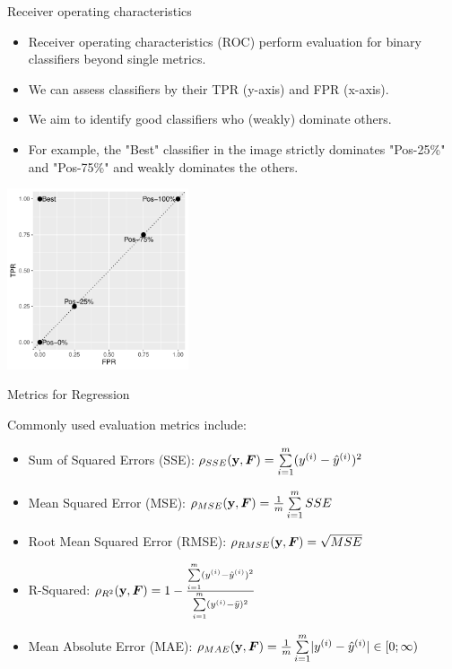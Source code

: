 \documentclass[11pt,compress,t,notes=noshow, xcolor=table]{beamer}
\begin{document}
\begin{vbframe}{Receiver operating characteristics}

\begin{itemize}
\item Receiver operating characteristics (ROC) perform evaluation for binary classifiers beyond single metrics.
\item We can assess classifiers by their TPR (y-axis) and FPR (x-axis).
\item We aim to identify good classifiers who (weakly) dominate others. 
\item For example, the "Best" classifier in the image strictly dominates "Pos-25\%" and "Pos-75\%" and weakly dominates the others.
\end{itemize}
\begin{center}
    {\centering \includegraphics[width=0.4\textwidth]{figure/eval_mclass_roc_sp_2}}
    \end{center}


\end{vbframe}


\begin{vbframe}{Metrics for Regression}

Commonly used evaluation metrics include:
\begin{itemize}
\item Sum of Squared Errors (SSE): $\rho_{SSE}(\mathbf{y}, \boldsymbol{F})=\sum\limits_{i=1}^m (y^{(i)}- \hat{y}^{(i)})^2$
\item Mean Squared Error (MSE): $\rho_{MSE}(\mathbf{y}, \boldsymbol{F})=\frac{1}{m} \sum\limits_{i=1}^m SSE$
\item Root Mean Squared Error (RMSE): $\rho_{RMSE}(\mathbf{y}, \boldsymbol{F})= \sqrt{MSE}$
\item R-Squared: $\rho_{R^2}(\mathbf{y}, \boldsymbol{F}) = 1 - \frac{\sum\limits_{i=1}^m (y^{(i)}- \hat{y}^{(i)})^2}{\sum\limits_{i=1}^m (y^{(i)} - \bar{y})^2}$
\item Mean Absolute Error (MAE): $\rho_{MAE}(\mathbf{y}, \boldsymbol{F}) = \frac{1}{m} \sum\limits_{i=1}^m \rvert y^{(i)}- \hat{y}^{(i)} \rvert \in [0;\infty) \qquad$
\end{itemize}

\end{vbframe}
\end{document}
